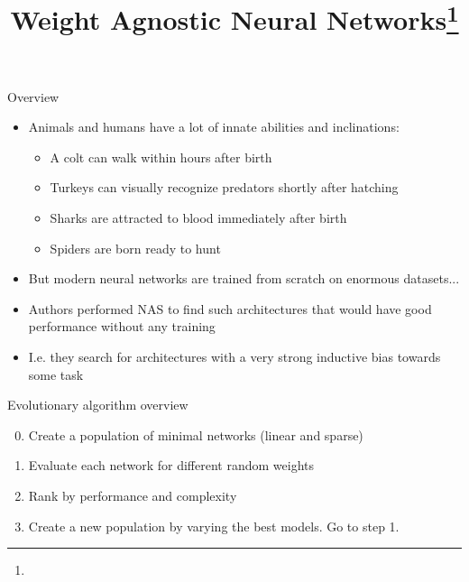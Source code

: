 \documentclass[handout, 10pt]{beamer}
\title{Weight Agnostic Neural Networks\footnote{\citepaper{WANN}}}
\begin{document}
\begin{frame}
    \titlepage
\end{frame}

\begin{frame}{Overview}
    \begin{itemize}
        \item\pause Animals and humans have a lot of innate abilities and inclinations:
            \begin{itemize}
                \item\pause A colt can walk within hours after birth
                \item\pause Turkeys can visually recognize predators shortly after hatching
                \item\pause Sharks are attracted to blood immediately after birth
                \item\pause Spiders are born ready to hunt
            \end{itemize}
        \item\pause But modern neural networks are trained from scratch on enormous datasets...
        \item\pause Authors performed NAS to find such architectures that would have good performance without any training
        \item\pause I.e. they search for architectures with a very strong inductive bias towards some task
    \end{itemize}
\end{frame}

\begin{frame}{Evolutionary algorithm overview}
    \begin{enumerate}
        \setcounter{enumi}{-1}
        \item\pause Create a population of minimal networks (linear and sparse)
        \item\pause Evaluate each network for different random weights
        \item\pause Rank by performance and complexity
        \item\pause Create a new population by varying the best models. Go to step 1.
    \end{enumerate}
\end{frame}
\end{document}
